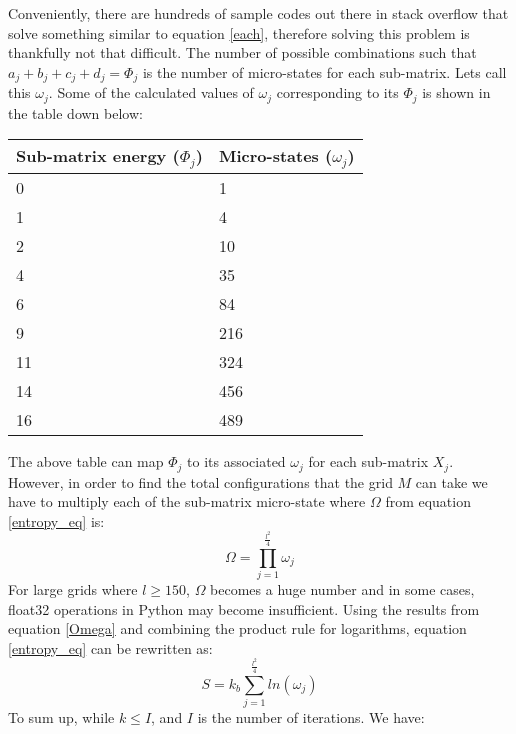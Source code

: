 \vspace{0.3cm}
\noindent
Conveniently, there are hundreds of sample codes out there in stack overflow that solve something similar to equation \ref{each}, therefore solving this problem is thankfully not that difficult. The number of possible combinations such that $a_{j}+b_{j}+c_{j}+d_{j}=\Phi_{j}$ is the number of micro-states for each sub-matrix. Lets call this $\omega_{j}$. Some of the calculated values of $\omega_{j}$ corresponding to its $\Phi_{j}$ is shown in the table down below: 
\begin{center}
\begin{tabular}{ |p{4.3cm}|p{3.2cm}|  }
 \hline
Sub-matrix energy ($\Phi_{j}$)& Micro-states ($\omega_{j}$)\\
 \hline
 0 & 1 \\
 1 & 4  \\
 2 & 10 \\
 4 & 35  \\
 6 & 84  \\
 9 & 216  \\
 11 & 324  \\
 14 & 456 \\ 
 16 & 489 \\
\hline
\end{tabular}
\end{center} 
The above table can map $\Phi_{j}$ to its associated $\omega_{j}$ for each sub-matrix $X_{j}$. However, in order to find the total configurations that the grid $M$ can take we have to multiply each of the sub-matrix micro-state where $\Omega$ from equation \ref{entropy_eq} is: 
\begin{equation}
    \Omega=\prod_{j=1}^{\frac{l^2}{4}} \omega_{j}
    \label{Omega}
\end{equation}
For large grids where $l \ge 150$, $\Omega$ becomes a huge number and in some cases, float32 operations in Python may become insufficient. Using the results from equation \ref{Omega} and combining the product rule for logarithms, equation \ref{entropy_eq} can be rewritten as: 
\begin{equation}
    S=k_b\sum_{j=1}^{\frac{l^2}{4}} ln(\omega_{j})
    \label{Total_entropy}
\end{equation}
\vspace{0,3cm}
\noindent
To sum up, while $k\leq I$, and $I$ is the number of iterations. We have:
